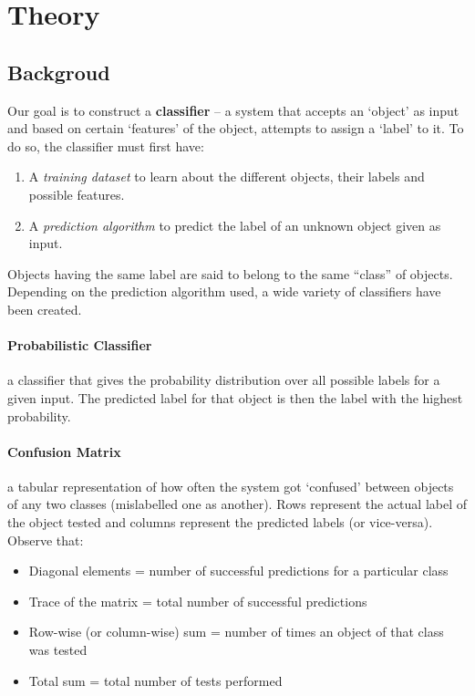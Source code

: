 \section{Theory}

\subsection{Backgroud}
Our goal is to construct a \textbf{classifier} -- a system that accepts an `object' as input and based on certain `features' of the object, attempts to assign a `label' to it.
To do so, the classifier must first have:
\begin{enumerate}[label={\roman*)}, nosep, topsep=0pt]
	\item A \textit{training dataset} to learn about the different objects, their labels and possible features.
	\item A \textit{prediction algorithm} to predict the label of an unknown object given as input.
\end{enumerate}
Objects having the same label are said to belong to the same ``class'' of objects.\\
Depending on the prediction algorithm used, a wide variety of classifiers have been created.

\paragraph{Probabilistic Classifier} a classifier that gives the probability distribution over all possible labels for a given input. The predicted label for that object is then the label with the highest probability.

\paragraph{Confusion Matrix} a tabular representation of how often the system got `confused' between objects of any two classes (mislabelled one as another). Rows represent the actual label of the object tested  and columns represent the predicted labels (or vice-versa). 
Observe that:
\begin{itemize}[nosep]
	\item Diagonal elements = number of successful predictions for a particular class
	\item Trace of the matrix = total number of successful predictions  
	\item Row-wise (or column-wise) sum = number of times an object of that class was tested
	\item Total sum = total number of tests performed
\end{itemize}


